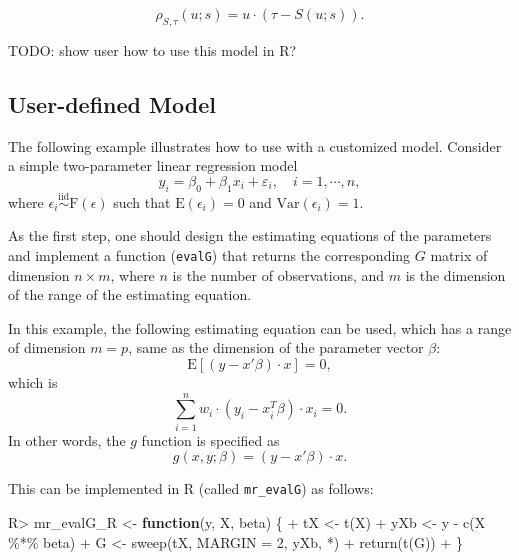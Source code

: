 \documentclass[article]{jss}
\newenvironment{Shaded}{\begin{snugshade}}{\end{snugshade}}
\newcommand{\AttributeTok}[1]{\textcolor[rgb]{0.77,0.63,0.00}{#1}}
\newcommand{\ControlFlowTok}[1]{\textcolor[rgb]{0.13,0.29,0.53}{\textbf{#1}}}
\newcommand{\DecValTok}[1]{\textcolor[rgb]{0.00,0.00,0.81}{#1}}
\newcommand{\FunctionTok}[1]{\textcolor[rgb]{0.00,0.00,0.00}{#1}}
\newcommand{\NormalTok}[1]{#1}
\newcommand{\OtherTok}[1]{\textcolor[rgb]{0.56,0.35,0.01}{#1}}
\newcommand{\SpecialCharTok}[1]{\textcolor[rgb]{0.00,0.00,0.00}{#1}}
\newcommand{\StringTok}[1]{\textcolor[rgb]{0.31,0.60,0.02}{#1}}
\renewcommand{\|}{\,|\,}
\begin{document}
\begin{equation}
\rho_{S,\tau}(u;s) = u\cdot(\tau - S(u;s)).
\end{equation}

TODO: show user how to use this model in R?

\hypertarget{user-defined-model}{%
\subsection{User-defined Model}\label{user-defined-model}}

The following example illustrates how to use  with a customized model. Consider a simple two-parameter linear regression model
\[
  y_i = \beta_0 + \beta_1x_i + \varepsilon_i, \quad i=1,\cdots,n,
\]
where \(\epsilon_i \stackrel {\textrm{iid}}{\sim}\text{F}(\epsilon)\) such that \(\textrm{E}(\epsilon_i) = 0\) and \(\text{Var}(\epsilon_i) = 1\).

As the first step, one should design the estimating equations of the parameters and implement a function (\texttt{evalG}) that returns the corresponding \(G\) matrix of dimension \(n\times m\), where \(n\) is the number of observations, and \(m\) is the dimension of the range of the estimating equation.

In this example, the following estimating equation can be used, which has a range of dimension \(m=p\), same as the dimension of the parameter vector \(\beta\):
\[
  \textrm{E}[(y-x'\beta)\cdot x] = 0,
\]
which is
\[
  \sum_{i=1}^n w_i\cdot (y_i-x_i^T\beta)\cdot x_i = 0.
\]
In other words, the \(g\) function is specified as
\[
  g(x,y;\beta) = (y-x'\beta)\cdot x.
\]

This can be implemented in R (called \texttt{mr\_evalG}) as follows:

\begin{Shaded}
\begin{Highlighting}[]
\NormalTok{R}\SpecialCharTok{\textgreater{}}\NormalTok{ mr\_evalG\_R }\OtherTok{\textless{}{-}} \ControlFlowTok{function}\NormalTok{(y, X, beta) \{}
\SpecialCharTok{+}\NormalTok{    tX }\OtherTok{\textless{}{-}} \FunctionTok{t}\NormalTok{(X)}
\SpecialCharTok{+}\NormalTok{    yXb }\OtherTok{\textless{}{-}}\NormalTok{ y }\SpecialCharTok{{-}} \FunctionTok{c}\NormalTok{(X }\SpecialCharTok{\%*\%}\NormalTok{ beta)}
\SpecialCharTok{+}\NormalTok{    G }\OtherTok{\textless{}{-}} \FunctionTok{sweep}\NormalTok{(tX, }\AttributeTok{MARGIN =} \DecValTok{2}\NormalTok{, yXb, }\StringTok{\textasciigrave{}}\AttributeTok{*}\StringTok{\textasciigrave{}}\NormalTok{)}
\SpecialCharTok{+}    \FunctionTok{return}\NormalTok{(}\FunctionTok{t}\NormalTok{(G))}
\SpecialCharTok{+}\NormalTok{  \}}
\end{Highlighting}
\end{Shaded}
\end{document}
